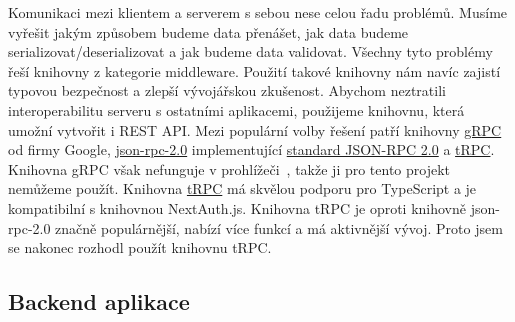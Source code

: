 Komunikaci mezi klientem a serverem s sebou nese celou řadu problémů.
Musíme vyřešit jakým způsobem budeme data přenášet, jak data budeme serializovat\slash deserializovat a jak budeme data validovat.
Všechny tyto problémy řeší knihovny z kategorie middleware.
Použití takové knihovny nám navíc zajistí typovou bezpečnost a zlepší vývojářskou zkušenost.
Abychom neztratili interoperabilitu serveru s ostatními aplikacemi, použijeme knihovnu, která umožní vytvořit i REST API\@.
Mezi populární volby řešení patří knihovny \href{https://grpc.io/}{gRPC} od firmy Google, \href{https://www.npmjs.com/package/json-rpc-2.0}{json-rpc-2.0} implementující \href{https://www.jsonrpc.org/specification}{standard JSON-RPC 2.0}  a \href{https://trpc.io/}{tRPC}.
Knihovna gRPC však nefunguje v prohlížeči~\cite{state-of-grpc}, takže ji pro tento projekt nemůžeme použít.
Knihovna \href{https://trpc.io/}{tRPC} má skvělou podporu pro TypeScript a je kompatibilní s knihovnou NextAuth.js.
Knihovna tRPC je oproti knihovně json-rpc-2.0 značně populárnější, nabízí více funkcí a má aktivnější vývoj.
Proto jsem se nakonec rozhodl použít knihovnu tRPC\@.

\subsection{Backend aplikace}\label{subsec:backend-aplikace}

